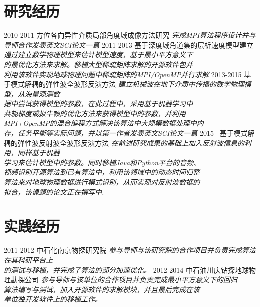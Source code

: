 \documentclass[]{friggeri-cv}
\begin{document}
\section{研究经历}

\begin{entrylist}
  \entry
    {2010-2011}
    {方位各向异性介质局部角度域成像方法研究}
	{\emph{完成MPI算法程序设计并与导师合作发表英文SCI论文一篇}}
  \entry
    {2011-2013}
    {基于深度域角道集的层析速度模型建立}
    {\emph{通过建立数学物理模型来估计模型速度，基于最小平方意义下\\
		   的最优化方法来求解。移植大型稀疏矩阵求解的开源软件包并\\
		   利用该软件实现地球物理问题中稀疏矩阵的MPI/OpenMP并行求解}}
  \entry
    {2013-2015}
    {基于模式解耦的弹性波全波形反演方法}
    {\emph{建立机械波在地下介质中传播的数学物理模型，从海量观测数\\
	       据中尝试获得模型的参数，在此过程中，采用基于机器学习中\\
		   共轭梯度或拟牛顿的优化方法来获得模型中的参数，并利用\\
		   MPI+OpenMP的混合编程方式解决该算法中大规模数据处理中内\\
		   存，任务平衡等实际问题，并以第一作者发表英文SCI论文一篇
	}}
  \entry
    {2015--}
    {基于模式解耦的弹性波反射波全波形反演方法}
	{\emph{在前述研究成果的基础上加入反射波信息的利用，同样基于机器\\
		   学习来估计模型中的参数。同时移植Java和Python平台的音频、\\
		   视频识别开源算法到已有算法中，利用该领域中的动态时间归整\\
		   算法来对地球物理数据进行模式识别，从而实现对反射波数据的\\
		   拟合，该课题的论文正在撰写中.
	}}
\end{entrylist}

\section{实践经历}
\begin{entrylist}
  \entry
    {2011-2012}
    {中石化南京物探研究院}
	{\emph{
		参与导师与该研究院的合作项目并负责完成算法在其科研平台上\\
		的测试与移植，并完成了算法的部分加速优化。
	}}
  \entry
    {2012-2014}
    {中石油川庆钻探地球物理勘探公司}
	{\emph{
		参与导师与该单位的合作项目并负责完成最小平方意义下的回归\\
		算法编写与测试，加入开源软件的求解模块，并且最后完成在该\\
		单位独开发软件上的移植工作。
	}}
\end{entrylist}
\end{document}
